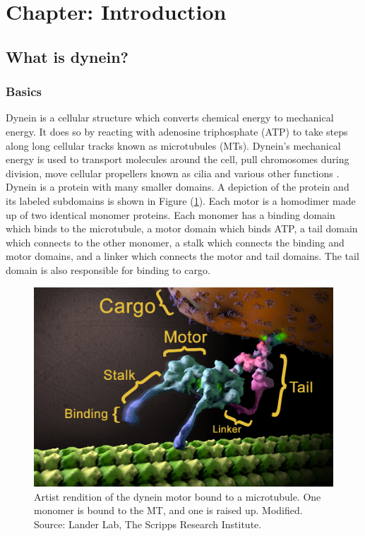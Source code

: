 \documentclass[10pt]{article} %
\begin{document}
\tableofcontents
\newpage

\section{Chapter: Introduction}
\subsection{What is dynein?}
\subsubsection{Basics}

Dynein is a cellular structure which converts chemical energy to mechanical energy. It does so by reacting with adenosine triphosphate (ATP) to take steps along long cellular tracks known as microtubules (MTs). Dynein's mechanical energy is used to transport molecules around the cell, pull chromosomes during division, move cellular propellers known as cilia and various other functions \cite{cianfroccoreview}.\\

Dynein is a protein with many smaller domains. A depiction of the protein and its labeled subdomains is shown in Figure (\ref{dynein-artist-rendition}). Each motor is a homodimer made up of two identical monomer proteins. Each monomer has a binding domain which binds to the microtubule, a motor domain which binds ATP, a tail domain which connects to the other monomer, a stalk which connects the binding and motor domains, and a linker which connects the motor and tail domains. The tail domain is also responsible for binding to cargo.\\

\begin{figure}[h]
  \centering
  \includegraphics[width=.65\textwidth,keepaspectratio]{../figures/dynein-artist-rendition.jpg}
  \caption{Artist rendition of the dynein motor bound to a microtubule. One monomer is bound to the MT, and one is raised up. Modified. Source: Lander Lab, The Scripps Research Institute.}
  \label{dynein-artist-rendition}
\end{figure}
\end{document}
